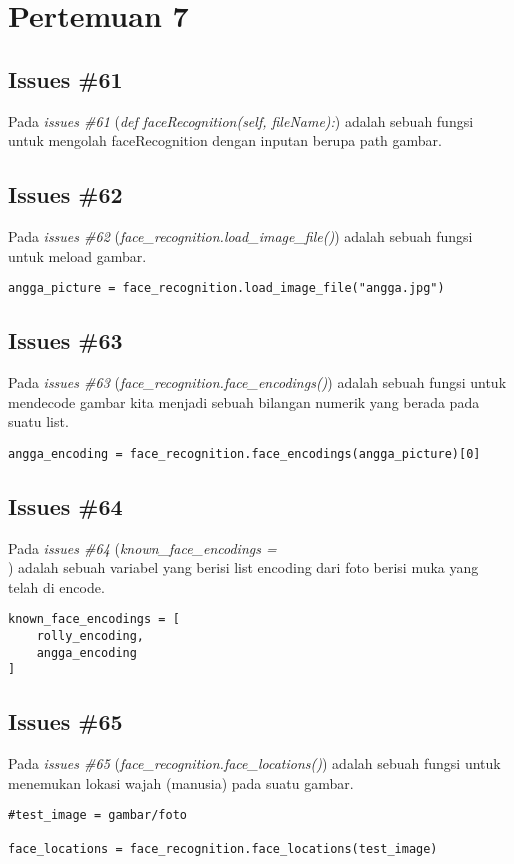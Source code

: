 \chapter{Pertemuan 7}

\section{Issues \#61}
Pada \textit{issues \#61} (\textit{def faceRecognition(self, fileName):}) adalah sebuah fungsi untuk mengolah faceRecognition dengan inputan berupa path gambar.

\section{Issues \#62}
Pada \textit{issues \#62} (\textit{face\_recognition.load\_image\_file()}) adalah sebuah fungsi untuk meload gambar.
\begin{verbatim}
angga_picture = face_recognition.load_image_file("angga.jpg")
\end{verbatim}

\section{Issues \#63}
Pada \textit{issues \#63} (\textit{face\_recognition.face\_encodings()}) adalah sebuah fungsi untuk mendecode gambar kita menjadi sebuah bilangan numerik yang berada pada suatu list.
\begin{verbatim}
angga_encoding = face_recognition.face_encodings(angga_picture)[0]
\end{verbatim}

\section{Issues \#64}
Pada \textit{issues \#64} (\textit{known\_face\_encodings = \[\]}) adalah sebuah variabel yang berisi list encoding dari foto berisi muka yang telah di encode.
\begin{verbatim}
known_face_encodings = [
    rolly_encoding,
    angga_encoding
]
\end{verbatim}

\section{Issues \#65}
Pada \textit{issues \#65} (\textit{face\_recognition.face\_locations()}) adalah sebuah fungsi untuk menemukan lokasi wajah (manusia) pada suatu gambar.
\begin{verbatim}
#test_image = gambar/foto

face_locations = face_recognition.face_locations(test_image)
\end{verbatim}

